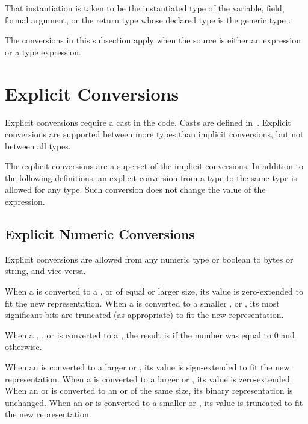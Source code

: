 That instantiation is taken to be the instantiated type of the variable,
field, formal argument, or the return type whose declared type
is the generic type .

The conversions in this subsection apply when the source is either an expression
or a type expression.

\section{Explicit Conversions}
\label{Explicit_Conversions}

Explicit conversions require a cast in the code.  Casts are defined
in~.  Explicit conversions are supported between more
types than implicit conversions, but not between all types.

The explicit conversions are a superset of the implicit conversions.
In addition to the following definitions,
an explicit conversion from a type to the same type is allowed for any type.
Such conversion does not change the value of the expression.

\subsection{Explicit Numeric Conversions}
\label{Explicit_Numeric_Conversions}

Explicit conversions are allowed from any numeric type or boolean to bytes or
string, and vice-versa.

When a  is converted to a , 
or  of equal or larger size, its value is zero-extended to fit the
new representation.  When a  is converted to a
smaller ,  or , its most significant
bits are truncated (as appropriate) to fit the new representation.

When a , , or  is converted to a , the result is  if the number was equal to 0 and  otherwise.

When an  is converted to a larger  or , its value is
sign-extended to fit the new representation.
When a  is converted to a larger  or , its value
is zero-extended.
When an  or  is converted to an  or 
of the same size, its binary representation is unchanged.
When an  or  is converted to a smaller 
or , its value is truncated to fit the new representation.

